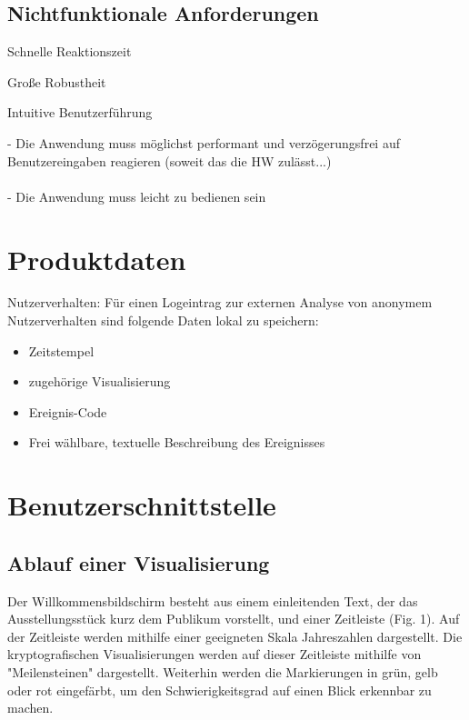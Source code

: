\documentclass{article}
\begin{document}
\subsection{Nichtfunktionale Anforderungen}

\begin{NA}[start=100]
\item Schnelle Reaktionszeit
\end{NA}
\begin{NA}[start=200]
\item Große Robustheit
\end{NA}
\begin{NA}[start=300]
\item Intuitive Benutzerführung
\end{NA}

- Die Anwendung muss möglichst performant und verzögerungsfrei auf Benutzereingaben reagieren (soweit das die HW zulässt...)
\\
\\
- Die Anwendung muss leicht zu bedienen sein

\section{Produktdaten}
\begin{PD}[start=10]
  \item Nutzerverhalten: Für einen Logeintrag zur externen Analyse von anonymem Nutzerverhalten sind folgende Daten lokal zu speichern:
  \begin{itemize}
    \item Zeitstempel
    \item zugehörige Visualisierung
    \item Ereignis-Code
    \item Frei wählbare, textuelle Beschreibung des Ereignisses
  \end{itemize}
\end{PD}

\section{Benutzerschnittstelle}

\subsection{Ablauf einer Visualisierung}

Der Willkommensbildschirm besteht aus einem einleitenden Text, der das Ausstellungsstück kurz dem Publikum vorstellt, und einer Zeitleiste (Fig. 1). Auf der Zeitleiste werden mithilfe einer geeigneten Skala Jahreszahlen dargestellt. Die kryptografischen Visualisierungen werden auf dieser Zeitleiste mithilfe von "Meilensteinen" dargestellt. Weiterhin werden die Markierungen in grün, gelb oder rot eingefärbt, um den Schwierigkeitsgrad auf einen Blick erkennbar zu machen.
\end{document}
